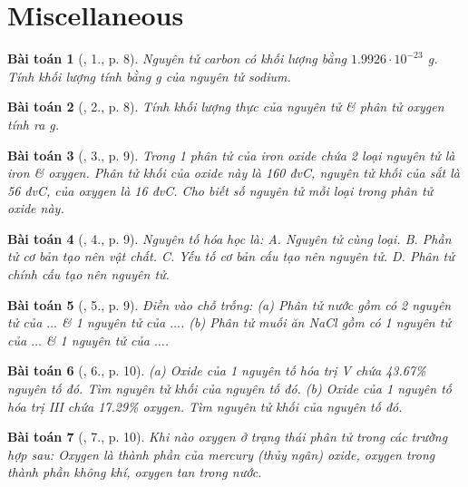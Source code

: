 \documentclass{article}
\newtheorem{baitoan}{Bài toán}
\begin{document}

\section{Miscellaneous}

\begin{baitoan}[\cite{An_Hoa_Hoc_nang_cao_8_9}, 1., p. 8]
	Nguyên tử carbon có khối lượng bằng $1.9926\cdot10^{-23}$ {\rm g}. Tính khối lượng tính bằng {\rm g} của nguyên tử sodium.
\end{baitoan}

\begin{baitoan}[\cite{An_Hoa_Hoc_nang_cao_8_9}, 2., p. 8]
	Tính khối lượng thực của nguyên tử \& phân tử oxygen tính ra {\rm g}.
\end{baitoan}

\begin{baitoan}[\cite{An_Hoa_Hoc_nang_cao_8_9}, 3., p. 9]
	Trong 1 phân tử của iron oxide chứa 2 loại nguyên tử là iron \& oxygen. Phân tử khối của oxide này là {\rm160 đvC}, nguyên tử khối của sắt là {\rm56 đvC}, của oxygen là {\rm16 đvC}. Cho biết số nguyên tử mỗi loại trong phân tử oxide này.
\end{baitoan}

\begin{baitoan}[\cite{An_Hoa_Hoc_nang_cao_8_9}, 4., p. 9]
	Nguyên tố hóa học là: {\sf A.} Nguyên tử cùng loại. {\sf B.} Phần tử cơ bản tạo nên vật chất. {\sf C.} Yếu tố cơ bản cấu tạo nên nguyên tử. {\sf D.} Phân tử chính cấu tạo nên nguyên tử.
\end{baitoan}

\begin{baitoan}[\cite{An_Hoa_Hoc_nang_cao_8_9}, 5., p. 9]
	Điền vào chỗ trống: (a) Phân tử nước {\rm{}} gồm có 2 nguyên tử của $\ldots$ \& 1 nguyên tử của $\ldots$. (b) Phân tử muối ăn {\rm NaCl} gồm có 1 nguyên tử của $\ldots$ \& 1 nguyên tử của $\ldots$.
\end{baitoan}

\begin{baitoan}[\cite{An_Hoa_Hoc_nang_cao_8_9}, 6., p. 10]
	(a) Oxide của 1 nguyên tố hóa trị V chứa {\rm43.67\%} nguyên tố đó. Tìm nguyên tử khối của nguyên tố đó. (b) Oxide của 1 nguyên tố hóa trị III chứa {\rm17.29\%} oxygen. Tìm nguyên tử khối của nguyên tố đó.
\end{baitoan}

\begin{baitoan}[\cite{An_Hoa_Hoc_nang_cao_8_9}, 7., p. 10]
	Khi nào oxygen ở trạng thái phân tử trong các trường hợp sau: Oxygen là thành phần của mercury (thủy ngân) oxide, oxygen trong thành phần không khí, oxygen tan trong nước.
\end{baitoan}
\end{document}
